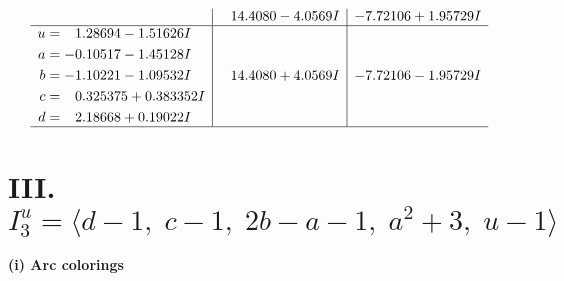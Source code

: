 \documentclass[1p]{elsarticle_modified}
\theoremstyle{definition}
\begin{document}
$$\begin{array}{c|c|c}
 & \phantom{-}14.4080 - 4.0569 I & -7.72106 + 1.95729 I \\ \hline\begin{aligned}
u &= \phantom{-}1.28694 - 1.51626 I \\
a &= -0.10517 - 1.45128 I \\
b &= -1.10221 - 1.09532 I \\
c &= \phantom{-}0.325375 + 0.383352 I \\
d &= \phantom{-}2.18668 + 0.19022 I\end{aligned}
 & \phantom{-}14.4080 + 4.0569 I & -7.72106 - 1.95729 I\\
 \hline 
 \end{array}$$\newpage\newpage\renewcommand{\arraystretch}{1}
\centering \section*{III. $I^u_{3}= \langle d-1,\;c-1,\;2 b- a-1,\;a^2+3,\;u-1 \rangle$}
\flushleft \textbf{(i) Arc colorings}\\
\end{document}
